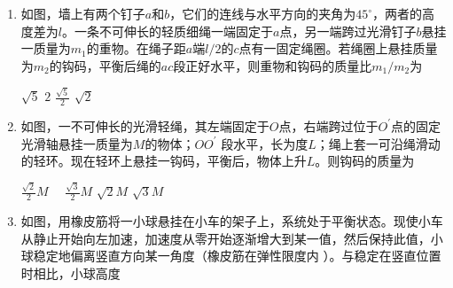 \begin{enumerate}
\item 
{}
如图，墙上有两个钉子$ a $和$ b $，它们的连线与水平方向的夹角为$ 45 ^{ \circ } $，两者的高度差为$ l $。一条不可伸长的轻质细绳一端固定于$ a $点，另一端跨过光滑钉子$ b $悬挂一质量为$ m_{1} $的重物。在绳子距$ a $端$ l/2 $的$ c $点有一固定绳圈。若绳圈上悬挂质量为$ m_{2} $的钩码，平衡后绳的$ ac $段正好水平，则重物和钩码的质量比$ m_{1} / m_{2} $为  

\begin{minipage}[h!]{0.7\linewidth}
\vspace{0.3em}
\fourchoices
{$ \sqrt { 5 } $}
{$ 2 $}
{$ \frac { \sqrt { 5 } } { 2 } $}
{$ \sqrt { 2 } $}
\vspace{0.3em}
\end{minipage}
\hfill
\begin{minipage}[h!]{0.3\linewidth}
\flushright
\vspace{0.3em}

\vspace{0.3em}
\end{minipage}

\item 
{}
如图，一不可伸长的光滑轻绳，其左端固定于$ O $点，右端跨过位于$ O ^{\prime} $点的固定光滑轴悬挂一质量为$ M $的物体；$ OO ^{\prime} $ 段水平，长为度$ L $；绳上套一可沿绳滑动的轻环。现在轻环上悬挂一钩码，平衡后，物体上升$ L $。则钩码的质量为  

\begin{minipage}[h!]{0.7\linewidth}
\vspace{0.3em}
\fourchoices
{$\frac { \sqrt { 2 } } { 2 } M \quad$}
{$\frac { \sqrt { 3 } } { 2 } M $}
{$ \sqrt { 2 } M $}
{$ \sqrt { 3 } M$	}

\vspace{0.3em}
\end{minipage}
\hfill
\begin{minipage}[h!]{0.3\linewidth}
\flushright
\vspace{0.3em}

\vspace{0.3em}
\end{minipage}
\item 
{}
如图，用橡皮筋将一小球悬挂在小车的架子上，系统处于平衡状态。现使小车从静止开始向左加速，加速度从零开始逐渐增大到某一值，然后保持此值，小球稳定地偏离竖直方向某一角度（橡皮筋在弹性限度内 ）。与稳定在竖直位置时相比，小球高度  
\begin{figure}[h!]
\centering

\end{figure}



\end{enumerate}

